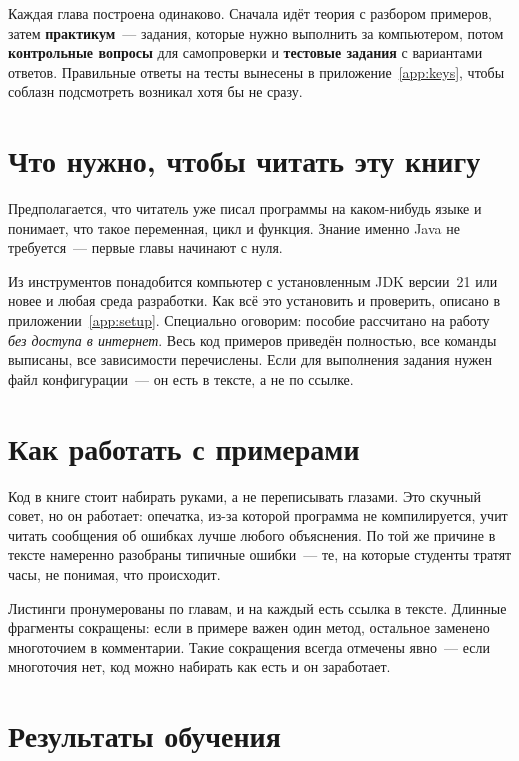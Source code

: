 Каждая глава построена одинаково. Сначала идёт теория с разбором примеров, затем
\textbf{практикум}~--- задания, которые нужно выполнить за компьютером, потом
\textbf{контрольные вопросы} для самопроверки и \textbf{тестовые задания} с
вариантами ответов. Правильные ответы на тесты вынесены в приложение~\ref{app:keys},
чтобы соблазн подсмотреть возникал хотя бы не сразу.

\section*{Что нужно, чтобы читать эту книгу}

Предполагается, что читатель уже писал программы на каком-нибудь языке и понимает,
что такое переменная, цикл и функция. Знание именно Java не требуется~--- первые
главы начинают с нуля.

Из инструментов понадобится компьютер с установленным JDK версии~21 или новее и
любая среда разработки. Как всё это установить и проверить, описано в
приложении~\ref{app:setup}. Специально оговорим: пособие рассчитано на работу
\emph{без доступа в интернет}. Весь код примеров приведён полностью, все команды
выписаны, все зависимости перечислены. Если для выполнения задания нужен файл
конфигурации~--- он есть в тексте, а не по ссылке.

\section*{Как работать с примерами}

Код в книге стоит набирать руками, а не переписывать глазами. Это скучный совет,
но он работает: опечатка, из-за которой программа не компилируется, учит читать
сообщения об ошибках лучше любого объяснения. По той же причине в тексте
намеренно разобраны типичные ошибки~--- те, на которые студенты тратят часы,
не понимая, что происходит.

Листинги пронумерованы по главам, и на каждый есть ссылка в тексте. Длинные
фрагменты сокращены: если в примере важен один метод, остальное заменено
многоточием в комментарии. Такие сокращения всегда отмечены явно~--- если
многоточия нет, код можно набирать как есть и он заработает.

\section*{Результаты обучения}

